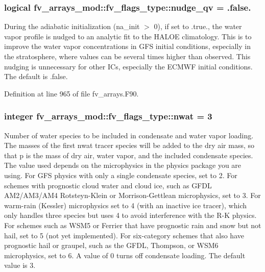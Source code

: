 \subsubsection[{nudge\-\_\-qv}]{\setlength{\rightskip}{0pt plus 5cm}logical fv\-\_\-arrays\-\_\-mod\-::fv\-\_\-flags\-\_\-type\-::nudge\-\_\-qv = .false.}\label{structfv__arrays__mod_1_1fv__flags__type_ac47cf9a2852553a0d3b1980b8b886774}


During the adiabatic initialization (na\-\_\-init $>$ 0), if set to .true., the water vapor profile is nudged to an analytic fit to the H\-A\-L\-O\-E climatology. This is to improve the water vapor concentrations in G\-F\-S initial conditions, especially in the stratosphere, where values can be several times higher than observed. This nudging is unnecessary for other I\-Cs, especially the E\-C\-M\-W\-F initial conditions. The default is .false. 



Definition at line 965 of file fv\-\_\-arrays.\-F90.

\subsubsection[{nwat}]{\setlength{\rightskip}{0pt plus 5cm}integer fv\-\_\-arrays\-\_\-mod\-::fv\-\_\-flags\-\_\-type\-::nwat = 3}\label{structfv__arrays__mod_1_1fv__flags__type_a42c93d1b25fbe7725462deeaa69f89a6}


Number of water species to be included in condensate and water vapor loading. The masses of the first nwat tracer species will be added to the dry air mass, so that p is the mass of dry air, water vapor, and the included condensate species. The value used depends on the microphysics in the physics package you are using. For G\-F\-S physics with only a single condensate species, set to 2. For schemes with prognostic cloud water and cloud ice, such as G\-F\-D\-L A\-M2/\-A\-M3/\-A\-M4 Rotsteyn-\/\-Klein or Morrison-\/\-Gettlean microphysics, set to 3. For warm-\/rain (Kessler) microphysics set to 4 (with an inactive ice tracer), which only handles three species but uses 4 to avoid interference with the R-\/\-K physics. For schemes such as W\-S\-M5 or Ferrier that have prognostic rain and snow but not hail, set to 5 (not yet implemented). For six-\/category schemes that also have prognostic hail or graupel, such as the G\-F\-D\-L, Thompson, or W\-S\-M6 microphysics, set to 6. A value of 0 turns off condensate loading. The default value is 3. 



